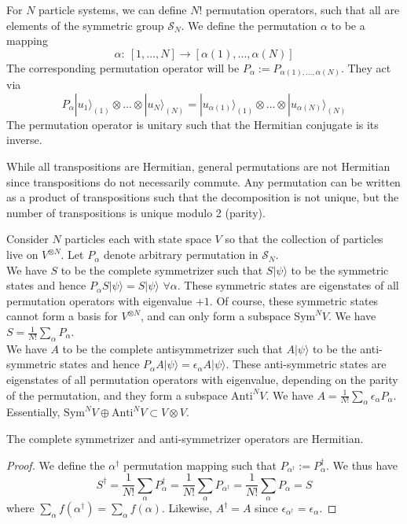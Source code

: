 \documentclass[a4paper]{article}
\begin{document}
\begin{defi}
For $N$ particle systems, we can define $N!$ permutation operators, such that all are elements of the symmetric group $\mathcal{S}_N$. We define the permutation $\alpha$ to be a mapping
$$\alpha:~ [1,...,N]\rightarrow[\alpha(1),...,\alpha(N)]$$
The corresponding permutation operator will be $P_\alpha:=P_{\alpha(1),...,\alpha(N)}$. They act via
$$P_{\alpha}|u_1\rangle_{(1)}\otimes...\otimes|u_N\rangle_{(N)}=|u_{\alpha(1)}\rangle_{(1)}\otimes...\otimes|u_{\alpha(N)}\rangle_{(N)}$$
The permutation operator is unitary such that the Hermitian conjugate is its inverse.
\end{defi}
\begin{thm}
While all transpositions are Hermitian, general permutations are not Hermitian since transpositions do not necessarily commute. Any permutation can be written as a product  of transpositions such that the decomposition is not unique, but the number of transpositions is unique modulo 2 (parity).
\end{thm}
\begin{defi}
Consider $N$ particles each with state space $V$ so that the collection of particles live on $V^{\otimes N}$. Let $P_\alpha$ denote arbitrary permutation in $\mathcal{S}_N$.\\[5pt]
We have $S$ to be the complete symmetrizer such that $S|\psi\rangle$ to be the symmetric states and hence $P_\alpha S|\psi\rangle=S|\psi\rangle$ $\forall\alpha$. These symmetric states are eigenstates of all permutation operators with eigenvalue $+1$. Of course, these symmetric states cannot form a basis for $V^{\otimes N}$, and can only form a subspace $\text{Sym}^NV$. We have $S=\frac{1}{N!}\sum_\alpha P_\alpha$.\\[5pt]
We have $A$ to be the complete antisymmetrizer such that $A|\psi\rangle$ to be the anti-symmetric states and hence $P_\alpha A|\psi\rangle=\epsilon_\alpha A|\psi\rangle$. These anti-symmetric states are eigenstates of all permutation operators with eigenvalue, depending on the parity of the permutation, and they form a subspace $\text{Anti}^NV$. We have $A=\frac{1}{N!}\sum_\alpha\epsilon_\alpha P_\alpha$. Essentially, $\text{Sym}^NV\oplus\text{Anti}^NV\subset V\otimes V$.
\end{defi}
\begin{thm}
The complete symmetrizer and anti-symmetrizer operators are Hermitian.
\end{thm}
\begin{proof}
We define the $\alpha^\dag$ permutation mapping such that $P_{\alpha^\dag}:=P_\alpha^\dag$. We thus have
$$S^\dag=\frac{1}{N!}\sum_\alpha P_\alpha^\dag=\frac{1}{N!}\sum_\alpha P_{\alpha^\dag}=\frac{1}{N!}\sum_\alpha P_\alpha=S$$
where $\sum_\alpha f(\alpha^\dag)=\sum_\alpha f(\alpha)$. Likewise, $A^\dag=A$ since $\epsilon_{\alpha^\dag}=\epsilon_\alpha$.
\end{proof}
\end{document}
